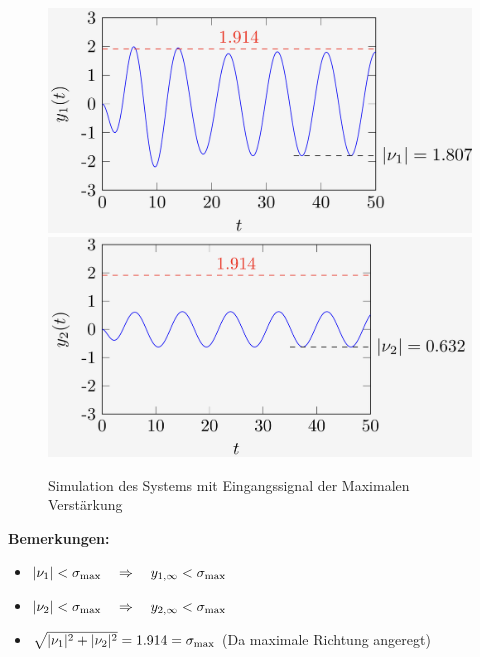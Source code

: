         \begin{figure}[H]
            \centering
            \includegraphics[width = 0.45\linewidth]{images/07/freq_resp_bsp_1.jpeg}
            \includegraphics[width = 0.45\linewidth]{images/07/freq_resp_bsp_2.jpeg}
            \caption{Simulation des Systems mit Eingangssignal der Maximalen Verstärkung}
        \end{figure}
        
        \textbf{Bemerkungen:}
        \begin{itemize}
            \item $|\nu_1| < \sigma_\textnormal{max} \quad\Rightarrow\quad y_{1,\infty} < \sigma_\textnormal{max}$
            \item $|\nu_2| < \sigma_\textnormal{max} \quad\Rightarrow\quad y_{2,\infty} < \sigma_\textnormal{max}$
            \item $\sqrt{|\nu_1|^2 + |\nu_2|^2} = 1.914 = \sigma_\textnormal{max}$ (Da maximale Richtung angeregt)
        \end{itemize}